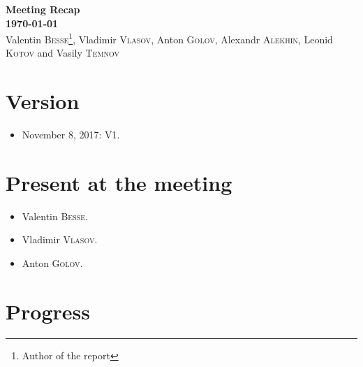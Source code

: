 \documentclass[12pt,a4paper]{article}
\begin{document}
	
	
\begin{center}
	{\bf\Large Meeting Recap~\MakeUppercase{}}\\
	{\bf\Large \today}\\
	\vspace{0.4cm}
	{\large Valentin \textsc{Besse}\footnote{Author of the report}, Vladimir \textsc{Vlasov}, Anton \textsc{Golov}, Alexandr \textsc{Alekhin}, Leonid \textsc{Kotov} and Vasily \textsc{Temnov}}\\
	\vspace{0.6cm}
\end{center}
\vspace{0.1cm}

\section*{Version}

\begin{itemize}
    \item November 8, 2017: V1.
\end{itemize}

\section*{Present at the meeting}

\begin{itemize}
    \item Valentin \textsc{Besse}.
    \item Vladimir \textsc{Vlasov}.
    \item Anton \textsc{Golov}.
\end{itemize}

\section*{Progress}
\end{document}
